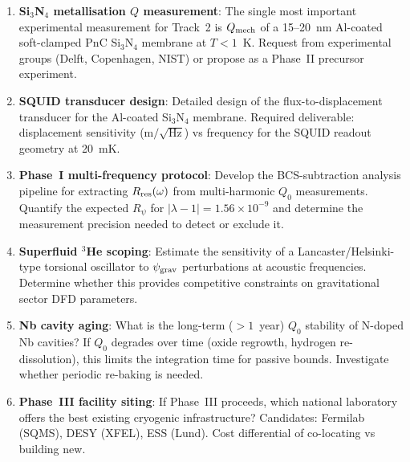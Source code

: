 \documentclass[11pt]{article}
\theoremstyle{definition}
\theoremstyle{remark}
\newcommand{\ee}[1]{\times 10^{#1}}
\newcommand{\psigrav}{\psi_{\rm grav}}
\newcommand{\lambdabound}{1.56\ee{-9}}
\newcommand{\lam}{|\lambda-1|}
\newcommand{\Qmech}{Q_{\rm mech}}
\begin{document}
\begin{enumerate}[nosep]
  \item \textbf{Si$_3$N$_4$ metallisation $Q$ measurement}: The single
    most important experimental measurement for Track~2 is $\Qmech$ of
    a 15--20~nm Al-coated soft-clamped PnC Si$_3$N$_4$ membrane at
    $T < 1$~K. Request from experimental groups (Delft, Copenhagen,
    NIST) or propose as a Phase~II precursor experiment.

  \item \textbf{SQUID transducer design}: Detailed design of the
    flux-to-displacement transducer for the Al-coated Si$_3$N$_4$
    membrane. Required deliverable: displacement sensitivity
    ($\text{m}/\sqrt{\text{Hz}}$) vs frequency for the SQUID readout
    geometry at 20~mK.

  \item \textbf{Phase~I multi-frequency protocol}: Develop the
    BCS-subtraction analysis pipeline for extracting $R_{\rm res}(\omega)$
    from multi-harmonic $Q_0$ measurements. Quantify the expected
    $R_\psi$ for $\lam = \lambdabound$ and determine the measurement
    precision needed to detect or exclude it.

  \item \textbf{Superfluid $^3$He scoping}: Estimate the sensitivity
    of a Lancaster/Helsinki-type torsional oscillator to $\psigrav$
    perturbations at acoustic frequencies. Determine whether this
    provides competitive constraints on gravitational sector DFD
    parameters.

  \item \textbf{Nb cavity aging}: What is the long-term ($>1$~year)
    $Q_0$ stability of N-doped Nb cavities? If $Q_0$ degrades over
    time (oxide regrowth, hydrogen re-dissolution), this limits the
    integration time for passive bounds. Investigate whether periodic
    re-baking is needed.

  \item \textbf{Phase~III facility siting}: If Phase~III proceeds,
    which national laboratory offers the best existing cryogenic
    infrastructure? Candidates: Fermilab (SQMS), DESY (XFEL), ESS
    (Lund). Cost differential of co-locating vs building new.
\end{enumerate}
\end{document}
